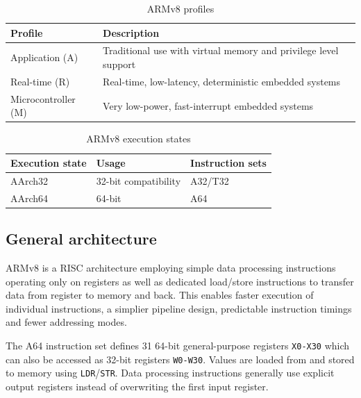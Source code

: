 \begin{table}[h!]
    \centering
    \caption{ARMv8 profiles}
    \begin{tabularx}{\textwidth}{lX}
        \toprule
        Profile & Description \\
        \midrule
        Application (A) & Traditional use with virtual memory and privilege level support \\
        Real-time (R) & Real-time, low-latency, deterministic embedded systems \\
        Microcontroller (M) & Very low-power, fast-interrupt embedded systems \\
        \bottomrule
    \end{tabularx}
\end{table}

\begin{table}[h!]
    \centering
    \caption{ARMv8 execution states}
    \begin{tabularx}{\textwidth}{llX}
        \toprule
        Execution state & Usage & Instruction sets \\
        \midrule
        AArch32 & 32-bit compatibility & A32/T32 \\
        AArch64 & 64-bit & A64 \\
        \bottomrule
    \end{tabularx}
\end{table}

\subsection{General architecture}

ARMv8 is a RISC architecture employing simple data processing instructions
operating only on registers as well as dedicated load/store instructions to
transfer data from register to memory and back. This enables faster execution
of individual instructions, a simplier pipeline design, predictable instruction
timings and fewer addressing modes.

The A64 instruction set defines 31 64-bit general-purpose registers
\texttt{X0-X30} which can also be accessed as 32-bit registers \texttt{W0-W30}.
Values are loaded from and stored to memory using \texttt{LDR}/\texttt{STR}.
Data processing instructions generally use explicit output registers instead of
overwriting the first input register.

